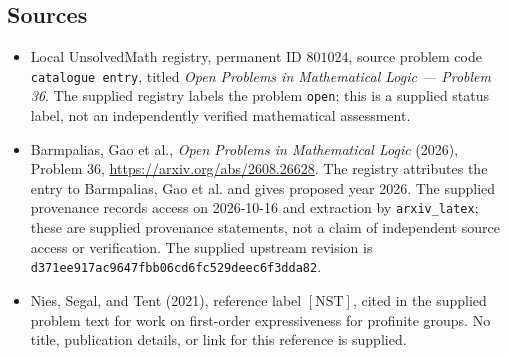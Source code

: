 \documentclass[11pt]{article}
\begin{document}
\subsection{Sources}
\begin{itemize}
\item Local UnsolvedMath registry, permanent ID \(801024\), source problem code \texttt{catalogue entry}, titled \emph{Open Problems in Mathematical Logic --- Problem 36}. The supplied registry labels the problem \texttt{open}; this is a supplied status label, not an independently verified mathematical assessment.
\item Barmpalias, Gao et al., \emph{Open Problems in Mathematical Logic} (2026), Problem 36, \url{https://arxiv.org/abs/2608.26628}. The registry attributes the entry to Barmpalias, Gao et al. and gives proposed year 2026. The supplied provenance records access on 2026-10-16 and extraction by \texttt{arxiv\_latex}; these are supplied provenance statements, not a claim of independent source access or verification. The supplied upstream revision is \texttt{d371ee917ac9647fbb06cd6fc529deec6f3dda82}.
\item Nies, Segal, and Tent (2021), reference label \([\mathrm{NST}]\), cited in the supplied problem text for work on first-order expressiveness for profinite groups. No title, publication details, or link for this reference is supplied.
\end{itemize}
\end{document}
